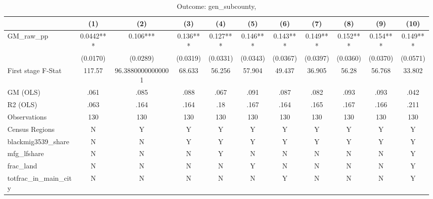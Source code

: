 \begin{table}[htbp]\centering
\def\sym#1{\ifmmode^{#1}\else\(^{#1}\)\fi}
\caption{Outcome: gen\_subcounty, }
\begin{tabular}{l*{10}{c}}
\toprule
            &\multicolumn{1}{c}{(1)}   &\multicolumn{1}{c}{(2)}   &\multicolumn{1}{c}{(3)}   &\multicolumn{1}{c}{(4)}   &\multicolumn{1}{c}{(5)}   &\multicolumn{1}{c}{(6)}   &\multicolumn{1}{c}{(7)}   &\multicolumn{1}{c}{(8)}   &\multicolumn{1}{c}{(9)}   &\multicolumn{1}{c}{(10)}   \\
\midrule
GM\_raw\_pp   &    0.0442***&     0.106***&     0.136***&     0.127***&     0.146***&     0.143***&     0.149***&     0.152***&     0.154***&     0.149***\\
            &  (0.0170)   &  (0.0289)   &  (0.0319)   &  (0.0331)   &  (0.0343)   &  (0.0367)   &  (0.0397)   &  (0.0360)   &  (0.0370)   &  (0.0571)   \\
\midrule
First stage F-Stat&    117.57   &96.38800000000001   &    68.633   &    56.256   &    57.904   &    49.437   &    36.905   &     56.28   &    56.768   &    33.802   \\
GM (OLS)    &      .061   &      .085   &      .088   &      .067   &      .091   &      .087   &      .082   &      .093   &      .093   &      .042   \\
R2 (OLS)    &      .063   &      .164   &      .164   &       .18   &      .167   &      .164   &      .165   &      .167   &      .166   &      .211   \\
Observations&       130   &       130   &       130   &       130   &       130   &       130   &       130   &       130   &       130   &       130   \\
Census Regions&         N   &         Y   &         Y   &         Y   &         Y   &         Y   &         Y   &         Y   &         Y   &         Y   \\
blackmig3539\_share&         N   &         N   &         Y   &         Y   &         Y   &         Y   &         Y   &         Y   &         Y   &         Y   \\
mfg\_lfshare &         N   &         N   &         N   &         Y   &         N   &         N   &         N   &         N   &         N   &         Y   \\
frac\_land   &         N   &         N   &         N   &         N   &         Y   &         N   &         N   &         N   &         N   &         Y   \\
totfrac\_in\_main\_city&         N   &         N   &         N   &         N   &         N   &         Y   &         N   &         N   &         N   &         Y   \\

\end{tabular}
\end{table}
